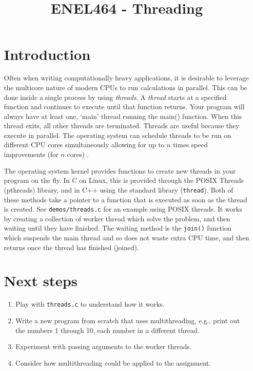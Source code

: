 \documentclass[a4paper,11pt]{article}
\newcommand{\code}[1]{\texttt{#1}}
\begin{document}
\title{ \bf ENEL464 - Threading }
\author{}
\date{}
\maketitle


\section{Introduction}

Often when writing computationally heavy applications, it is desirable to
leverage the multicore nature of modern CPUs to run calculations in parallel.
This can be done inside a single process by using \emph{threads}. A
\emph{thread} starts at a specified function and continues to execute until that
function returns. Your program will always have at least one, `main' thread
running the main() function. When this thread exits, all other threads are
terminated. Threads are useful because they execute in parallel. The operating
system can schedule threads to be run on different CPU cores simultaneously
allowing for up to $n$ times speed improvements (for $n$ cores) \footnotemark.

The operating system kernel provides functions to create new threads in your
program on the fly. In C on Linux, this is provided through the POSIX Threads
(pthreads) library, and in C++ using the standard library (\code{thread}). Both
of these methods take a pointer to a function that is executed as soon as the
thread is created. See \code{demos/threads.c} for an example using POSIX
threads. It works by creating a collection of worker thread which solve the
problem, and then waiting until they have finished. The waiting method is the
\code{join()} function which suspends the main thread and so does not waste
extra CPU time, and then returns once the thread has finished (joined).


\section{Next steps}

\begin{enumerate}
    \item Play with \code{threads.c} to understand how it works.
    \item Write a new program from scratch that uses multithreading,
      e.g., print out the numbers 1 through 10, each number in a
      different thread.
    \item Experiment with passing arguments to the worker threads.
    \item Consider how multithreading could be applied to the assignment.
\end{enumerate}
\end{document}
